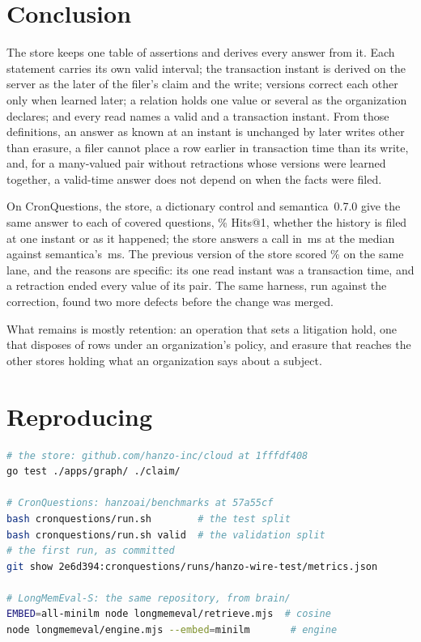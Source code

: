 \section{Conclusion}
\label{sec:conclusion}

The store keeps one table of assertions and derives every answer from it. Each
statement carries its own valid interval; the transaction instant is derived on
the server as the later of the filer's claim and the write; versions correct
each other only when learned later; a relation holds one value or several as
the organization declares; and every read names a valid and a transaction
instant. From those definitions, an answer as known at an instant is unchanged
by later writes other than erasure, a filer cannot place a row earlier in
transaction time than its write, and, for a many-valued pair without
retractions whose versions were learned together, a valid-time answer does not
depend on when the facts were filed.

On CronQuestions, the store, a dictionary control and semantica~0.7.0 give the
same answer to each of  covered questions, \%
Hits@1, whether the history is filed at one instant or as it happened; the
store answers a call in \,ms at the median against
semantica's \,ms. The previous version of the store scored
\% on the same lane, and the reasons are specific: its
one read instant was a transaction time, and a retraction ended every value of
its pair. The same harness, run against the correction, found two more defects
before the change was merged.

What remains is mostly retention: an operation that sets a litigation hold, one
that disposes of rows under an organization's policy, and erasure that reaches
the other stores holding what an organization says about a subject.

\section*{Reproducing}

\begin{lstlisting}[language=bash]
# the store: github.com/hanzo-inc/cloud at 1fffdf408
go test ./apps/graph/ ./claim/

# CronQuestions: hanzoai/benchmarks at 57a55cf
bash cronquestions/run.sh        # the test split
bash cronquestions/run.sh valid  # the validation split
# the first run, as committed
git show 2e6d394:cronquestions/runs/hanzo-wire-test/metrics.json

# LongMemEval-S: the same repository, from brain/
EMBED=all-minilm node longmemeval/retrieve.mjs  # cosine
node longmemeval/engine.mjs --embed=minilm       # engine
\end{lstlisting}

